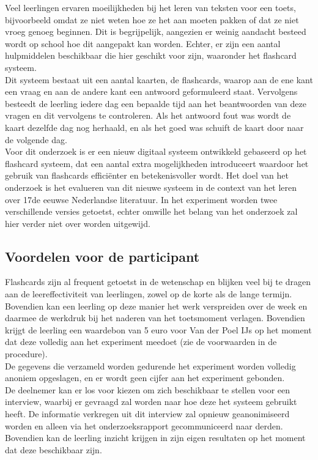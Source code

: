 Veel leerlingen ervaren moeilijkheden bij het leren van teksten voor een toets, bijvoorbeeld omdat ze niet weten hoe ze het aan moeten pakken of dat ze niet vroeg genoeg beginnen. Dit is begrijpelijk, aangezien er weinig aandacht besteed wordt op school hoe dit aangepakt kan worden. Echter, er zijn een aantal hulpmiddelen beschikbaar die hier geschikt voor zijn, waaronder het flashcard systeem. \\[2ex]
Dit systeem bestaat uit een aantal kaarten, de flashcards, waarop aan de ene kant een vraag en aan de andere kant een antwoord geformuleerd staat. Vervolgens besteedt de leerling iedere dag een bepaalde tijd aan het beantwoorden van deze vragen en dit vervolgens te controleren. Als het antwoord fout was wordt de kaart dezelfde dag nog herhaald, en als het goed was schuift de kaart door naar de volgende dag. \\[2ex]
Voor dit onderzoek is er een nieuw digitaal systeem ontwikkeld gebaseerd op het flashcard systeem, dat een aantal extra mogelijkheden introduceert waardoor het gebruik van flashcards efficiënter en betekenisvoller wordt. Het doel van het onderzoek is het evalueren van dit nieuwe systeem in de context van  het leren over 17de eeuwse Nederlandse literatuur. In het experiment worden twee verschillende versies getoetst, echter omwille het belang van het onderzoek zal hier verder niet over worden uitgewijd. \\[2ex]

\subsection{Voordelen voor de participant}

Flashcards zijn al frequent getoetst in de wetenschap en blijken veel bij te dragen aan de leereffectiviteit van leerlingen, zowel op de korte als de lange termijn. Bovendien kan een leerling op deze manier het werk verspreiden over de week en daarmee de werkdruk bij het naderen van het toetsmoment verlagen. Bovendien krijgt de leerling een waardebon van 5 euro voor Van der Poel IJs op het moment dat deze volledig aan het experiment meedoet (zie de voorwaarden in de procedure). \\[2ex]
De gegevens die verzameld worden gedurende het experiment worden volledig anoniem opgeslagen, en er wordt geen cijfer aan het experiment gebonden. \\[2ex]
De deelnemer kan er los voor kiezen om zich beschikbaar te stellen voor een interview, waarbij er gevraagd zal worden naar hoe deze het systeem gebruikt heeft. De informatie verkregen uit dit interview zal opnieuw geanonimiseerd worden en alleen via het onderzoeksrapport gecommuniceerd naar derden. Bovendien kan de leerling inzicht krijgen in zijn eigen resultaten op het moment dat deze beschikbaar zijn. \\[2ex]
 
